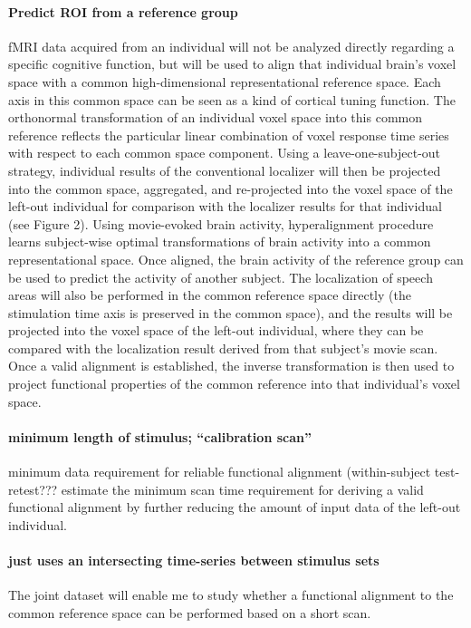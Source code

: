 \paragraph{Predict ROI from a reference group}
%
fMRI data acquired from an individual will not be analyzed directly regarding a
specific cognitive function, but will be used to align that individual brain's
voxel space with a common high-dimensional representational reference space.
%
Each axis in this common space can be seen as a kind of cortical tuning
function.
%
The orthonormal transformation of an individual voxel space into this common
reference reflects the particular linear combination of voxel response time
series with respect to each common space component.
%
Using a leave-one-subject-out strategy, individual results of the conventional
localizer will then be projected into the common space, aggregated, and
re-projected into the voxel space of the left-out individual for comparison with
the localizer results for that individual (see Figure 2).
%
Using movie-evoked brain activity, hyperalignment procedure learns subject-wise
optimal transformations of brain activity into a common representational space.
%
Once aligned, the brain activity of the reference group can be used to predict
the activity of another subject.
%
The localization of speech areas will also be performed in the common reference
space directly (the stimulation time axis is preserved in the common space), and
the results will be projected into the voxel space of the left-out individual,
where they can be compared with the localization result derived from that
subject’s movie scan.
%
Once a valid alignment is established, the inverse transformation is then used
to project functional properties of the common reference into that individual's
voxel space.


\paragraph{minimum length of stimulus; ``calibration scan''}
%
minimum data requirement for reliable functional alignment (within-subject
test-retest???
%
estimate the minimum scan time requirement for deriving a valid functional
alignment by further reducing the amount of input data of the left-out
individual.
\paragraph{just uses an intersecting time-series between stimulus sets}
%
The joint dataset will enable me to study whether a functional alignment to the
common reference space can be performed based on a short scan.


